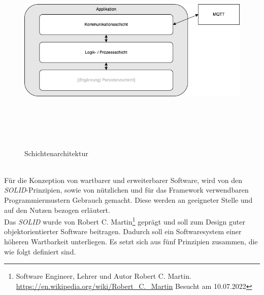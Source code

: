     \begin{figure}[hbt!]
        \centering
        \includegraphics[width=14cm,height=10cm,keepaspectratio]{images/Schichtenarchitektur.png}
        \caption{Schichtenarchitektur}
        \label{fig:schichtenarchitektur}
    \end{figure}
    \\
    Für die Konzeption von wartbarer und erweiterbarer Software, wird von den \textit{SOLID}-Prinzipien, sowie von nützlichen 
    und für das Framework verwendbaren Programmiermustern Gebrauch gemacht. Diese werden an geeigneter Stelle und auf den Nutzen bezogen erläutert.
    \\
    \linebreak
    Das \textit{SOLID} wurde von Robert C. Martin\footnote{Software Engineer, Lehrer und Autor Robert C. Martin. \url{https://en.wikipedia.org/wiki/Robert_C._Martin} Besucht am 10.07.2022} 
    geprägt und soll zum Design guter objektorientierter Software beitragen. Dadurch soll 
    ein Softwaresystem einer höheren Wartbarkeit unterliegen. Es setzt sich aus fünf Prinzipien zusammen, die wie folgt definiert sind.
